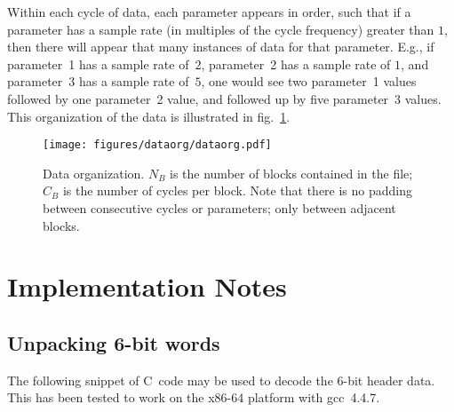 \documentclass{report}
\begin{document}
Within each cycle of data, each parameter appears in order, such that if a parameter has a sample rate (in multiples of the cycle frequency) greater than \(1\), then there will appear that many instances of data for that parameter. E.g., if parameter~1 has a sample rate of~\(2\), parameter~2 has a sample rate of \(1\), and parameter~3 has a sample rate of~\(5\), one would see two parameter~1 values followed by one parameter~2 value, and followed up by five parameter~3 values. This organization of the data is illustrated in fig.~\ref{Fig.DataOrganization}.

\begin{figure}[H]
	\centering
	\texttt{[image: figures/dataorg/dataorg.pdf]}
	\caption{Data organization. \(N_B\) is the number of blocks contained in
	         the file; \(C_B\) is the number of cycles per block. Note that there is no
	         padding between consecutive cycles or parameters; only between adjacent blocks.}
	\label{Fig.DataOrganization}
\end{figure}

\section{Implementation Notes}

\subsection{Unpacking 6-bit words}

The following snippet of C~code may be used to decode the 6-bit header data. This has been tested to work on the x86-64 platform with gcc~4.4.7.
\end{document}
